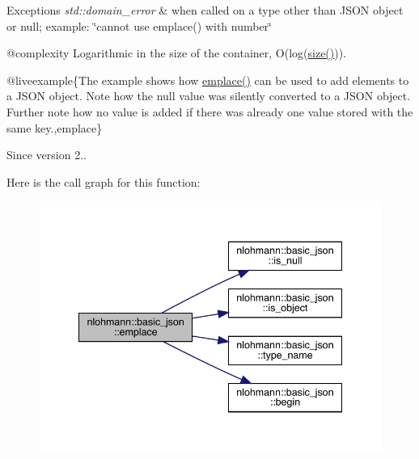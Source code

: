 \begin{DoxyExceptions}{Exceptions}
{\em std\+::domain\+\_\+error} & when called on a type other than J\+S\+ON object or null; example\+: {\ttfamily \char`\"{}cannot use emplace() with number\char`\"{}}\\
\hline
\end{DoxyExceptions}
@complexity Logarithmic in the size of the container, O(log({\ttfamily \mbox{\hyperlink{classnlohmann_1_1basic__json_a25e27ad0c6d53c01871c5485e1f75b96}{size()}}})).

@liveexample\{The example shows how {\ttfamily \mbox{\hyperlink{classnlohmann_1_1basic__json_a5338e282d1d02bed389d852dd670d98d}{emplace()}}} can be used to add elements to a J\+S\+ON object. Note how the {\ttfamily null} value was silently converted to a J\+S\+ON object. Further note how no value is added if there was already one value stored with the same key.,emplace\}

\begin{DoxySince}{Since}
version 2.. 
\end{DoxySince}
Here is the call graph for this function\+:\nopagebreak
\begin{figure}[H]
\begin{center}
\leavevmode
\includegraphics[width=341pt]{classnlohmann_1_1basic__json_a5338e282d1d02bed389d852dd670d98d_cgraph}
\end{center}
\end{figure}
\mbox{\label{classnlohmann_1_1basic__json_aacf5eed15a8b66fb1e88910707a5e229}} 
